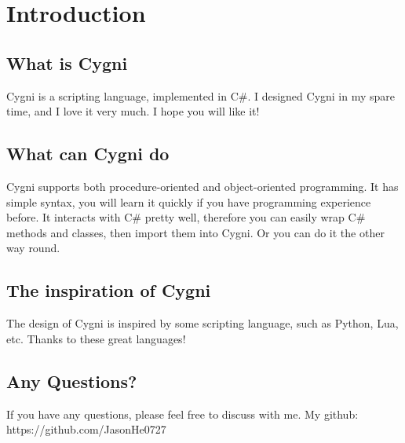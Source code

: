 \chapter{Introduction}
\section{What is Cygni}
Cygni is a scripting language, implemented in C\#. 
I designed Cygni in my spare time, and I love it very much. I hope you will like it!
\section{What can Cygni do}
Cygni supports both procedure-oriented and object-oriented programming. It has simple syntax, you will learn it quickly if you have programming experience before. It interacts with C\# pretty well, therefore you can easily wrap C\# methods and classes, then import them into Cygni. Or you can do it the other way round.
\section{The inspiration of Cygni}
The design of Cygni is inspired by some scripting language, such as Python, Lua, etc. Thanks to these great languages!
\section{Any Questions?} 
If you have any questions, please feel free to discuss with me. My github: https://github.com/JasonHe0727


